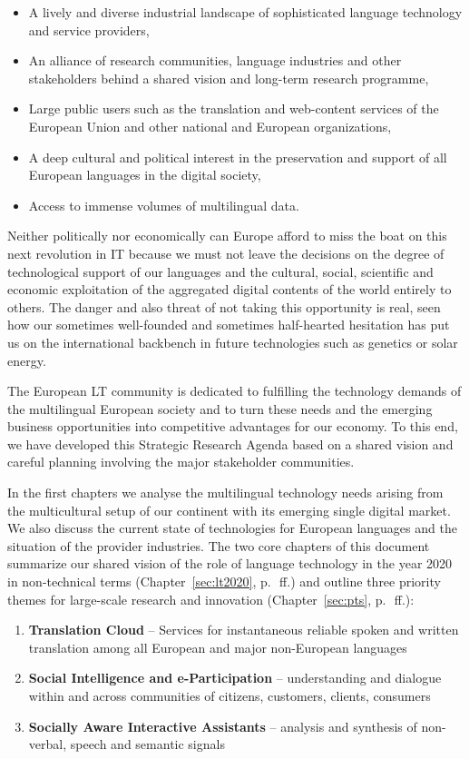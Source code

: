 \documentclass[10pt, plain]{../../metanetpaper}
\begin{document}
\begin{multicols}{2}
\begin{itemize}
\item A lively and diverse industrial landscape of sophisticated language technology and service providers,
\item An alliance of research communities, language industries and other stakeholders behind a shared vision and long-term research programme,
\item Large public users such as the translation and web-content services of the European Union and other national and European organizations,
\item A deep cultural and political interest in the preservation and support of all European languages in the digital society,
\item Access to immense volumes of multilingual data.
\end{itemize}

Neither politically nor economically can Europe afford to miss the boat on this next revolution in IT because we must not leave the decisions on the degree of technological support of our languages and the cultural, social, scientific and economic exploitation of the aggregated digital contents of the world entirely to others. The danger and also threat of not taking this opportunity is real, seen how our sometimes well-founded and sometimes half-hearted hesitation has put us on the international backbench in future technologies such as genetics or solar energy.

The European LT community is dedicated to fulfilling the technology demands of the multilingual European society and to turn these needs and the emerging business opportunities into competitive advantages for our economy. To this end, we have developed this Strategic Research Agenda based on a shared vision and careful planning involving the major stakeholder communities.

In the first chapters we analyse the multilingual technology needs arising from the multicultural setup of our continent with its emerging single digital market. We also discuss the current state of technologies for European languages and the situation of the provider industries. The two core chapters of this document summarize our shared vision of the role of language technology in the year 2020 in non-technical terms (Chapter~\ref{sec:lt2020}, p.~\pageref{sec:lt2020}\,ff.) and outline three priority themes for large-scale research and innovation (Chapter~\ref{sec:pts}, p.~\pageref{sec:pts}\,ff.):

\begin{enumerate}
\item \textbf{Translation Cloud} -- Services for instantaneous reliable spoken and written translation among all European and major non-European languages
\item \textbf{Social Intelligence and e-Participation} -- understanding and dialogue within and across communities of citizens, customers, clients, consumers
\item \textbf{Socially Aware Interactive Assistants} -- analysis and synthesis of non-verbal, speech and semantic signals
\end{enumerate}
 

\end{multicols}
\end{document}
